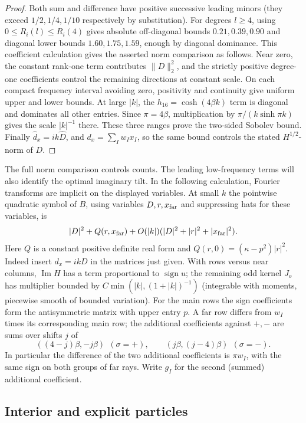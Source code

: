 \begin{proof}
Both sum and difference have positive successive leading minors (they exceed \(1/2,1/4,1/10\) respectively by substitution). For degrees \(l\ge4\), using \(0\le R_i(l)\le R_i(4)\) gives absolute off-diagonal bounds \(0.21,0.39,0.90\) and diagonal lower bounds \(1.60,1.75,1.59\), enough by diagonal dominance. This coefficient calculation gives the asserted norm comparison as follows. Near zero, the constant rank-one term contributes \(\|D\|_2^2\), and the strictly positive degree-one coefficients control the remaining directions at constant scale. On each compact frequency interval avoiding zero, positivity and continuity give uniform upper and lower bounds. At large \(|k|\), the \(h_{16}=\cosh(4\beta k)\) term is diagonal and dominates all other entries. Since \(\pi=4\beta\), multiplication by \(\pi/(k\sinh\pi k)\) gives the scale \(|k|^{-1}\) there. These three ranges prove the two-sided Sobolev bound. Finally \(\widehat d_x=ik\widehat D\), and \(d_x=\sum_Iw_Ix_I\), so the same bound controls the stated \(H^{1/2}\)-norm of \(D\).

\end{proof}

The full norm comparison controls counts. The leading low-frequency
terms will also identify the optimal imaginary tilt. In the following
calculation, Fourier transforms are implicit on the displayed
variables. At small \(k\) the pointwise quadratic symbol of \(B\), using variables \(D,r,x_{\rm far}\) and suppressing hats for these variables, is
\[
 |D|^2+Q(r,x_{\rm far})+O(|k|)(|D|^2+|r|^2+|x_{\rm far}|^2).
\]
Here \(Q\) is a constant positive definite real form and \(Q(r,0)=(\kappa-p^2)|r|^2\). Indeed insert \(d_x=ikD\) in the matrices just given. With rows versus near columns, \(\operatorname{Im}H\) has a term proportional to \(\operatorname{sign}u\); the remaining odd kernel \(J_o\) has multiplier bounded by \(C\min(|k|,(1+|k|)^{-1})\) (integrable with moments, piecewise smooth of bounded variation). For the main rows the sign coefficients form the antisymmetric matrix with upper entry \(p\). A far row differs from \(w_I\) times its corresponding main row; the additional coefficients against \(+,-\) are sums over shifts \(j\) of
\[
 ((4-j)\beta,-j\beta)\ \ (\sigma=+),\qquad
 (j\beta,(j-4)\beta)\ \ (\sigma=-).
\]
In particular the difference of the two additional coefficients is \(\pi w_I\), with the same sign on both groups of far rays. Write \(g_I\) for the second (summed) additional coefficient.

\subsection{Interior and explicit particles}

